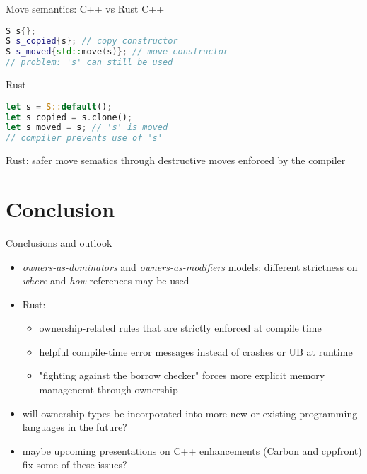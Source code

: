 \documentclass{beamer}
\begin{document}
\begin{frame}[fragile]{Move semantics: C++ vs Rust}
C++
\begin{lstlisting}[language=C++]
S s{};
S s_copied{s}; // copy constructor
S s_moved{std::move(s)}; // move constructor
// problem: 's' can still be used
\end{lstlisting}

Rust
\begin{lstlisting}[language=Rust]
let s = S::default();
let s_copied = s.clone();
let s_moved = s; // 's' is moved
// compiler prevents use of 's'
\end{lstlisting}

Rust: safer move sematics through destructive moves enforced by the compiler
\end{frame}


\section{Conclusion}

\begin{frame}{Conclusions and outlook}
\begin{itemize}
  \item \emph{owners-as-dominators} and \emph{owners-as-modifiers} models: different strictness on \emph{where} and \emph{how} references may be used
  \item Rust: 
  \begin{itemize}
    \item ownership-related rules that are strictly enforced at compile time
    \item helpful compile-time error messages instead of crashes or UB at runtime
    \item "fighting against the borrow checker" forces more explicit memory managenemt through ownership
  \end{itemize}
  \item will ownership types be incorporated into more new or existing programming languages in the future?
  \item maybe upcoming presentations on C++ enhancements (Carbon and cppfront) fix some of these issues?
\end{itemize}
\end{frame}
\end{document}
